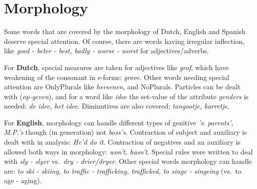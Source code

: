 
      \RosDate{\today}
      \RosSupersedes{-}
      \MakeRosTitle

\addtolength{\itemsep}{-2 ex}
\def\zinnen{\begin{description}}
\def\endzinnen{\end{description}}
\def\zin#1{\item[]{\em #1}}
\def\vertaling#1{\item[] - #1}
\def\Test#1{\vspace{1 ex} \item[Test:]{\bf #1}}
\def\test#1{\item[] - tests: #1}
\def\VR{\item VerbRaising}
\def\remark#1{\item[remark]#1}
\def\works{\item[status] operative}
\def\worksnotyet{\item[status] not yet operative}

\section{Morphology}
Some words that are covered by the morphology of Dutch, English and 
Spanish deserve special attention. Of course, there are words having 
irregular inflection, like {\em goed - beter - best, badly - worse - 
worst\/} for adjectives/adverbs.

For {\bf Dutch}, special measures are taken for adjectives like {\em grof\/},
which have weakening of the consonant in e-forms: {\em grove\/}. Other words
needing special attention are OnlyPlurals like {\em hersenen\/}, and
NoPlurals. Particles can be dealt with ({\em op-geven\/}), and for a word 
like {\em idee\/} the
set-value of the attribute {\em genders\/} is needed: {\em de idee, het idee\/}.
Diminutives are also covered: {\em tangootje, karretje\/}.

For {\bf English}, morphology can handle different types of genitive {\em 's\/}:
{\em parents', M.P.'s\/} though (in generation) not {\em boss's\/}. Contraction
of subject and auxiliary is dealt with in analysis: {\em He'd do it\/}. 
Contraction of negatives and an auxiliary is allowed both ways in morphology:
{\em won't, hasn't\/}. Special rules were written to deal with {\em sly - 
slyer\/} vs.\ {\em dry - drier/dryer\/}. Other special words morphology can 
handle are: {\em to ski - skiing, to traffic - trafficking, trafficked, to 
singe - singeing\/} (vs.\ to age - aging).

